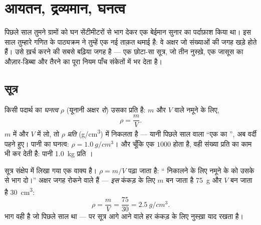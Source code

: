 \chapter{आयतन, द्रव्यमान, घनत्व}\label{ch:g7:volume-mass-density}

पिछले साल तुमने ग्रामों को घन सेंटीमीटरों से भाग देकर एक बेईमान सुनार
का पर्दाफ़ाश किया था। इस साल तुम्हारे गणित के पाठ्यक्रम ने तुम्हें एक
नई ताक़त थमाई है: वे अक्षर जो संख्याओं की जगह खड़े होते हैं। 
उसे ख़र्च करने की सबसे बढ़िया जगह है --- एक छोटा-सा सूत्र, जो तीन
नुस्ख़े, एक जासूस का औज़ार-डिब्बा और तैरने का पूरा नियम पाँच संकेतों में
भर देता है।

\section{सूत्र}

\begin{definition}[घनत्व, सूत्र से]\label{def:g7:volume-mass-density:formula}
किसी पदार्थ का \emph{घनत्व} $\rho$ (यूनानी अक्षर
\emph{रो}) उसका प्रति    है: $m$  और $V$
 वाले नमूने के लिए,
\[
\rho = \frac{m}{V}.
\]
$m$  में और $V$  में लो, तो $\rho$
\emph{ प्रति } (\unit{g/cm^3}) में निकलता है ---
यानी पिछले साल वाला ``एक  का '', अब वर्दी पहने
हुए। पानी का घनत्व: $\rho = \qty{1.0}{g/cm^3}$। और चूँकि एक 
$1000$  होता है, वही संख्या  प्रति  का काम भी
कर देती है: पानी \qty{1.0}{kg} प्रति ।
\end{definition}

\begin{example}[अक्षरों को पढ़ना]\label{ex:g7:volume-mass-density:reading}
सूत्र संक्षेप में लिखा गया एक वाक्य है। $\rho = m/V$ पढ़ा जाता है:
`` निकालने के लिए नमूने के  को उसके  से भाग दो।''
अक्षर जगह रोकने वाले हैं --- \emph{इस} कंकड़ के लिए $m$ बन जाता है
\qty{75}{g} और $V$ बन जाता है \qty{30}{cm^3}:
\[
\rho = \frac{m}{V} = \frac{75}{30} = \qty{2.5}{g/cm^3}.
\]
भाग वही है जो पिछले साल था --- पर सूत्र आगे आने वाले हर कंकड़ के लिए
नुस्ख़ा याद रखता है।
\end{example}

